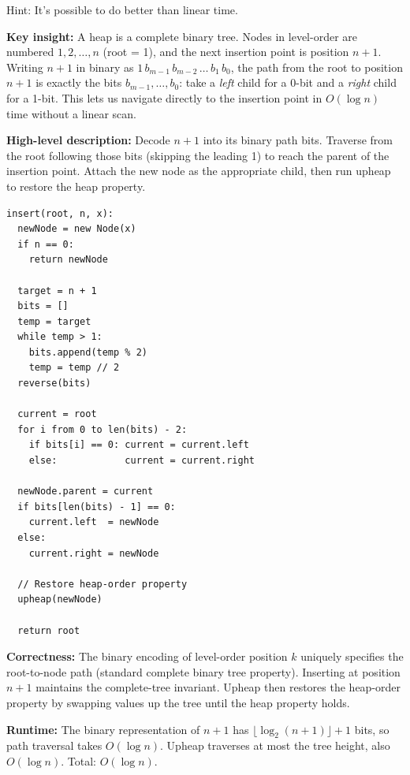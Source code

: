 \documentclass[addpoints]{exam}
\begin{document}
\begin{questions}
Hint: It's possible to do better than linear time.

\textbf{Key insight:} A heap is a complete binary tree. Nodes in level-order are numbered $1, 2, \ldots, n$ (root = 1), and the next insertion point is position $n+1$. Writing $n+1$ in binary as $1\,b_{m-1}\,b_{m-2}\,\ldots\,b_1\,b_0$, the path from the root to position $n+1$ is exactly the bits $b_{m-1}, \ldots, b_0$: take a \emph{left} child for a 0-bit and a \emph{right} child for a 1-bit. This lets us navigate directly to the insertion point in $O(\log n)$ time without a linear scan.

\textbf{High-level description:} Decode $n+1$ into its binary path bits. Traverse from the root following those bits (skipping the leading 1) to reach the parent of the insertion point. Attach the new node as the appropriate child, then run upheap to restore the heap property.

\begin{verbatim}
insert(root, n, x):
  newNode = new Node(x)
  if n == 0:
    return newNode

  target = n + 1
  bits = []
  temp = target
  while temp > 1:
    bits.append(temp % 2)
    temp = temp // 2
  reverse(bits)

  current = root
  for i from 0 to len(bits) - 2:
    if bits[i] == 0: current = current.left
    else:            current = current.right

  newNode.parent = current
  if bits[len(bits) - 1] == 0:
    current.left  = newNode
  else:
    current.right = newNode

  // Restore heap-order property
  upheap(newNode)

  return root
\end{verbatim}

\textbf{Correctness:} The binary encoding of level-order position $k$ uniquely specifies the root-to-node path (standard complete binary tree property). Inserting at position $n+1$ maintains the complete-tree invariant. Upheap then restores the heap-order property by swapping values up the tree until the heap property holds.

\textbf{Runtime:} The binary representation of $n+1$ has $\lfloor\log_2(n+1)\rfloor + 1$ bits, so path traversal takes $O(\log n)$. Upheap traverses at most the tree height, also $O(\log n)$. Total: $O(\log n)$.


\end{questions}
\end{document}
